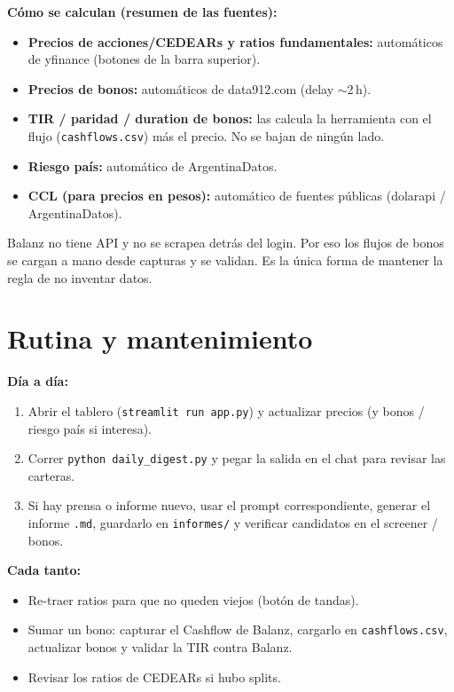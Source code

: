 \documentclass[11pt,a4paper]{article}
\newcommand{\code}[1]{\texttt{#1}}
\newcommand{\fpath}[1]{\texttt{#1}}
\begin{document}
\noindent\textbf{C\'omo se calculan (resumen de las fuentes):}

\begin{itemize}[leftmargin=1.4em]
  \item \textbf{Precios de acciones/CEDEARs y ratios fundamentales:} autom\'aticos de
  yfinance (botones de la barra superior).
  \item \textbf{Precios de bonos:} autom\'aticos de data912.com (delay $\sim$2\,h).
  \item \textbf{TIR / paridad / duration de bonos:} las calcula la herramienta con el
  flujo (\fpath{cashflows.csv}) m\'as el precio. No se bajan de ning\'un lado.
  \item \textbf{Riesgo pa\'is:} autom\'atico de ArgentinaDatos.
  \item \textbf{CCL (para precios en pesos):} autom\'atico de fuentes p\'ublicas
  (dolarapi / ArgentinaDatos).
\end{itemize}

\begin{nota}
Balanz no tiene API y no se scrapea detr\'as del login. Por eso los flujos de bonos se
cargan a mano desde capturas y se validan. Es la \'unica forma de mantener la regla de
no inventar datos.
\end{nota}

\section{Rutina y mantenimiento}

\noindent\textbf{D\'ia a d\'ia:}
\begin{enumerate}[leftmargin=1.4em]
  \item Abrir el tablero (\code{streamlit run app.py}) y actualizar precios (y bonos /
  riesgo pa\'is si interesa).
  \item Correr \code{python daily\_digest.py} y pegar la salida en el chat para
  revisar las carteras.
  \item Si hay prensa o informe nuevo, usar el prompt correspondiente, generar el
  informe \fpath{.md}, guardarlo en \fpath{informes/} y verificar candidatos en el
  screener / bonos.
\end{enumerate}

\noindent\textbf{Cada tanto:}
\begin{itemize}[leftmargin=1.4em]
  \item Re-traer ratios para que no queden viejos (botón de tandas).
  \item Sumar un bono: capturar el Cashflow de Balanz, cargarlo en
  \fpath{cashflows.csv}, actualizar bonos y validar la TIR contra Balanz.
  \item Revisar los ratios de CEDEARs si hubo splits.
\end{itemize}
\end{document}
